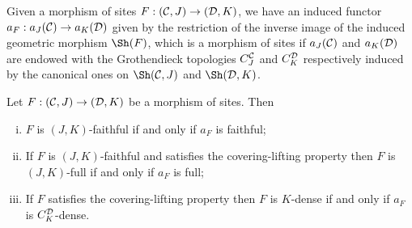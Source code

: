 \documentclass[a4paper,12pt]{article}
\begin{document}
Given a morphism of sites $F:({\cal C}, J)\to ({\cal D}, K)$, we have an induced functor $a_{F}:a_{J}({\cal C})\to a_{K}({\cal D})$ given by the restriction of the inverse image of the induced geometric morphism $\Sh(F)$, which is a morphism of sites if $a_{J}({\cal C})$ and $a_{K}({\cal D})$ are endowed with the Grothendieck topologies $C^{\cal C}_{J}$ and $C^{\cal D}_{K}$ respectively induced by the canonical ones on $\Sh({\cal C}, J)$ and $\Sh({\cal D}, K)$.

\begin{proposition}\label{proplocalproperties}
	Let $F:({\cal C}, J)\to ({\cal D}, K)$ be a morphism of sites. Then
	
	\begin{enumerate}[(i)]
		\item $F$ is $(J, K)$-faithful if and only if $a_{F}$ is faithful;
		
		\item If $F$ is $(J, K)$-faithful and satisfies the covering-lifting property then $F$ is $(J, K)$-full if and only if $a_{F}$ is full;
		
		\item If $F$ satisfies the covering-lifting property then $F$ is $K$-dense if and only if $a_{F}$ is $C^{\cal D}_{K}$-dense. 
	\end{enumerate}
\end{proposition}
\end{document}
